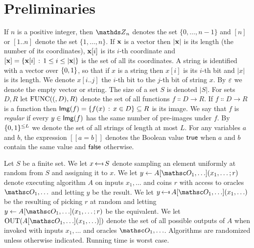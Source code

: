 \section{Preliminaries} \label{sec-prelims}

 If $n$ is a positive integer, then $\Z_n$ denotes the set $\{0, \ldots, n-1\}$ and $[n]$ or $[1..n]$ denote the set $\{1,\ldots,n\}$. 
If $\mathbf{x}$ is a vector then $|\mathbf{x}|$ is its length (the number of its coordinates), $\mathbf{x}[i]$ is its $i$-th coordinate 
and $[\mathbf{x}] = \{\mathbf{x}[i] \,:\, 1\leq i\leq |\mathbf{x}|\}$ is the set of all its coordinates. 
A string is identified with a vector over $\{0,1\}$, so that if $x$ is a string then $x[i]$ is its $i$-th bit and $|x|$ is its length. We denote $x[i..j]$ the $i$-th bit to the $j$-th bit of string $x$.
By $\varepsilon$ we denote the empty vector or string. The size of a set $S$ is denoted $|S|$. 
For sets $D,R$ let $\mathrm{FUNC}((,D),R)$ denote the set of all functions $f\Colon D\to R$. If $f\Colon D\to R$ is a function then $\mathsf{Img}(f) = \{f(x) \,:\, x\in D\}\subseteq R$ is its image. We say that $f$ is \textit{regular} if every $y\in\mathsf{Img}(f)$ has the same number of pre-images under $f$.
By $\{0,1\}^{\leq L}$ we denote the set of all strings of length at most $L$.
For any variables $a$ and $b$, the expression $[[a = b]]$ denotes the Boolean value $\mathsf{true}$ when $a$ and $b$ contain the same value and $\mathsf{false}$ otherwise.

Let $S$ be a finite set. We let $x \getsr S$ denote sampling an element uniformly at random from $S$ and assigning it to $x$. 
We let $y \gets A[\Oracle_1, \ldots](x_1,\ldots ;
r)$ denote executing algorithm $A$ on inputs $x_1,\ldots$ and coins $r$ with
access to oracles $\Oracle_1, \ldots$ and letting $y$ be the result. We let $y
\getsr A[\Oracle_1, \ldots ](x_1,\ldots)$ be the resulting of picking $r$ at
random and letting $y \gets A[\Oracle_1, \ldots](x_1,\ldots; r)$ be the equivalent. We let
$\Outputs(A[\Oracle_1, \ldots ](x_1,\ldots)])$ denote the set of all possible outputs
of $A$ when invoked with inputs $x_1,\ldots$ and oracles $\Oracle_1, \ldots$.
Algorithms are randomized unless
otherwise indicated. Running time is worst case.


